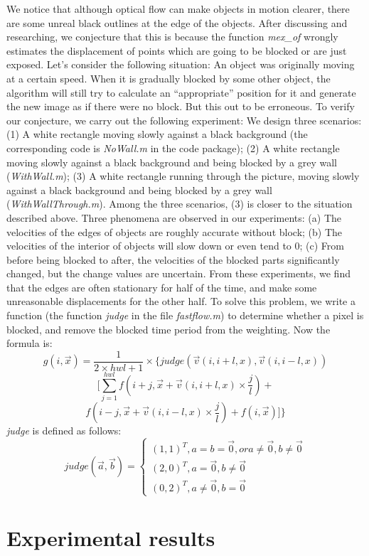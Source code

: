 \documentclass[10pt,twocolumn,letterpaper]{article}
\begin{document}
We notice that although optical flow can make objects in motion clearer, there are some unreal black outlines at the edge of the objects. After discussing and researching, we conjecture that this is because the function \emph{mex\_of} wrongly estimates the displacement of points which are going to be blocked or are just exposed. Let’s consider the following situation: An object was originally moving at a certain speed. When it is gradually blocked by some other object, the algorithm will still try to calculate an “appropriate” position for it and generate the new image as if there were no block. But this out to be erroneous.
To verify our conjecture, we carry out the following experiment: We design three scenarios: (1) A white rectangle moving slowly against a black background (the corresponding code is \emph{NoWall.m} in the code package); (2) A white rectangle moving slowly against a black background and being blocked by a grey wall (\emph{WithWall.m}); (3) A white rectangle running through the picture, moving slowly against a black background and being blocked by a grey wall (\emph{WithWallThrough.m}). Among the three scenarios, (3) is closer to the situation described above. Three phenomena are observed in our experiments: (a) The velocities of the edges of objects are roughly accurate without block; (b) The velocities of the interior of objects will slow down or even tend to 0; (c) From before being blocked to after, the velocities of the blocked parts significantly changed, but the change values are uncertain.
From these experiments, we find that the edges are often stationary for half of the time, and make some unreasonable displacements for the other half. To solve this problem, we write a function (the function \emph{judge} in the file \emph{fastflow.m}) to determine whether a pixel is blocked, and remove the blocked time period from the weighting. Now the formula is:
$$g(i,\Vec{x}) = \frac{1}{2\times hwl+1}\times\{judge(\Vec{v}(i,i+l,x),\Vec{v}(i,i-l,x))$$
$$[\sum_{j=1}^{hwl} f(i+j,\Vec{x}+\Vec{v}(i,i+l,x)\times\frac{j}{l})+$$
$$f(i-j,\Vec{x}+\Vec{v}(i,i-l,x)\times\frac{j}{l})+f(i,\Vec{x})]\}$$
\emph{judge} is defined as follows:
$$judge(\Vec{a},\Vec{b})=\begin{cases} (1,1)^T, a=b=\Vec{0}, or    a\neq\Vec{0},b\neq\Vec{0}\\ (2,0)^T, a=\Vec{0},b\neq\Vec{0}\\ (0,2)^T,a\neq\Vec{0},b=\Vec{0} \end{cases}$$

\section{Experimental results}
\end{document}
